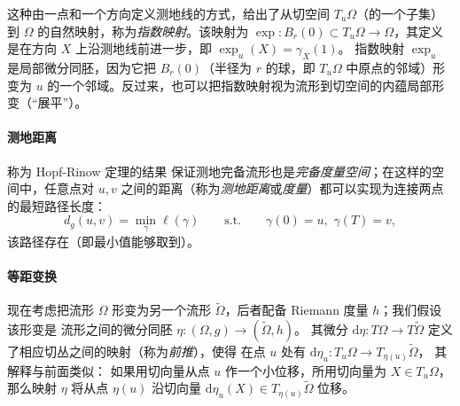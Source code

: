 %
这种由一点和一个方向定义测地线的方式，给出了从切空间 $T_u \Omega$（的一个子集）到 $\Omega$ 的自然映射，称为{\em 指数映射}。该映射为 $\exp : B_r(0) \subset T_u\Omega \rightarrow \Omega$，其定义是在方向 $X$ 上沿测地线前进一步，即 $\exp_u(X) = \gamma_X(1)$。%
%
指数映射 $\exp_u$ 是局部微分同胚，因为它把 $B_r(0)$（半径为 $r$ 的球，即 $T_u\Omega$ 中原点的邻域）形变为 $u$ 的一个邻域。反过来，也可以把指数映射视为流形到切空间的内蕴局部形变（“展平”）。




\paragraph{测地距离}
%
称为 Hopf-Rinow 定理的结果
%
保证测地完备流形也是{\em 完备度量空间}；在这样的空间中，任意点对 $u,v$ 之间的距离（称为{\em 测地距离}或{\em 度量}）都可以实现为连接两点的最短路径长度：
$$
d_g(u,v) = \min_{\gamma} \ell(\gamma) \quad\quad \text{s.t.} \quad\quad \gamma(0) = u, \,\, \gamma(T) = v,
$$
该路径存在（即最小值能够取到）。












\paragraph{等距变换}
现在考虑把流形 $\Omega$ 形变为另一个流形 $\tilde{\Omega}$，后者配备 Riemann 度量 $h$；我们假设该形变是
%
流形之间的微分同胚 $\eta: (\Omega, g) \rightarrow (\tilde{\Omega}, h)$。
%
其微分 $\mathrm{d}\eta : T\Omega \rightarrow T\tilde{\Omega}$ 定义了相应切丛之间的映射（称为{\em 前推}），使得
在点 $u$ 处有 $\mathrm{d}\eta_u : T_u \Omega \rightarrow T_{\eta(u)}\tilde{\Omega}$，%
%
其解释与前面类似：
如果用切向量从点 $u$ 作一个小位移，所用切向量为 $X \in T_u \Omega$，那么映射 $\eta$ 将从点 $\eta(u)$ 沿切向量 $\mathrm{d}\eta_u(X) \in T_{\eta(u)}\tilde{\Omega}$ 位移。


